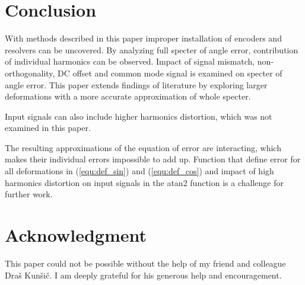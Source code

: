 \documentclass[a4paper]{article}
\begin{document}
\section{Conclusion}
With methods described in this paper improper installation of encoders and resolvers can be uncovered. By analyzing full specter of angle error, contribution of individual harmonics can be observed. Impact of signal mismatch, non-orthogonality, DC offset and common mode signal is examined on specter of angle error. This paper extends findings of literature by exploring larger deformations with a more accurate approximation of whole specter.

Input signals can also include higher harmonics distortion, which was not examined in this paper.

The resulting approximations of the equation of error are interacting, which makes their individual errors impossible to add up. Function that define error for all deformations in (\ref{equ:def_sin}) and (\ref{equ:def_cos}) and impact  of high harmonics distortion on input signals in the atan2 function is a challenge for further work. 

\small
\section*{Acknowledgment}
This paper could not be possible without the help of my friend and colleague Draš Kunšič. I am deeply grateful for his generous help and encouragement.
\end{document}
